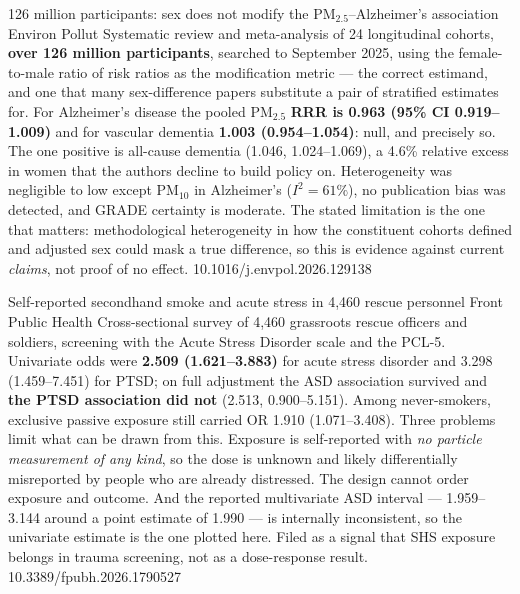 \documentclass[10pt]{article}
\begin{document}
{126 million participants: sex does not modify the PM$_{2.5}$--Alzheimer's association}
{Environ Pollut}
{Systematic review and meta-analysis of 24 longitudinal cohorts, \textbf{over 126 million
participants}, searched to September 2025, using the female-to-male ratio of risk ratios as
the modification metric --- the correct estimand, and one that many sex-difference papers
substitute a pair of stratified estimates for. For Alzheimer's disease the pooled
PM$_{2.5}$ \textbf{RRR is 0.963 (95\% CI 0.919--1.009)} and for vascular dementia
\textbf{1.003 (0.954--1.054)}: null, and precisely so. The one positive is all-cause
dementia (1.046, 1.024--1.069), a 4.6\% relative excess in women that the authors decline to
build policy on. Heterogeneity was negligible to low except PM$_{10}$ in Alzheimer's
($I^2=61\%$), no publication bias was detected, and GRADE certainty is moderate. The stated
limitation is the one that matters: methodological heterogeneity in how the constituent
cohorts defined and adjusted sex could mask a true difference, so this is evidence against
current \emph{claims}, not proof of no effect.}
{10.1016/j.envpol.2026.129138}

{Self-reported secondhand smoke and acute stress in 4{,}460 rescue personnel}
{Front Public Health}
{Cross-sectional survey of 4{,}460 grassroots rescue officers and soldiers, screening with
the Acute Stress Disorder scale and the PCL-5. Univariate odds were \textbf{2.509
(1.621--3.883)} for acute stress disorder and 3.298 (1.459--7.451) for PTSD; on full
adjustment the ASD association survived and \textbf{the PTSD association did not}
(2.513, 0.900--5.151). Among never-smokers, exclusive passive exposure still carried
OR 1.910 (1.071--3.408). Three problems limit what can be drawn from this. Exposure is
self-reported with \emph{no particle measurement of any kind}, so the dose is unknown and
likely differentially misreported by people who are already distressed. The design cannot
order exposure and outcome. And the reported multivariate ASD interval --- 1.959--3.144
around a point estimate of 1.990 --- is internally inconsistent, so the univariate estimate
is the one plotted here. Filed as a signal that SHS exposure belongs in trauma screening,
not as a dose-response result.}
{10.3389/fpubh.2026.1790527}

\end{document}
